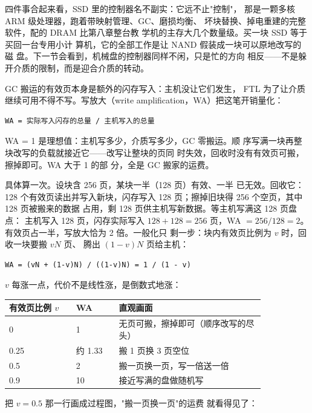 四件事合起来看，SSD 里的控制器名不副实：它远不止"控制"，
那是一颗多核 ARM 级处理器，跑着带映射管理、GC、磨损均衡、
坏块替换、掉电重建的完整软件，配的 DRAM 比第八章整台教
学机的主存大几个数量级。买一块 SSD 等于买回一台专用小计
算机，它的全部工作是让 NAND 假装成一块可以原地改写的磁
盘。下一节会看到，机械盘的控制器同样不闲，只是忙的方向
相反——不是躲开介质的限制，而是迎合介质的转动。

GC 搬运的有效页本身是额外的闪存写入：主机没让它们发生，
FTL 为了让介质继续可用不得不写。写放大（write
amplification，WA）把这笔开销量化：

\begin{lstlisting}
WA = 实际写入闪存的总量 / 主机写入的总量
\end{lstlisting}

WA = 1 是理想值：主机写多少，介质写多少，GC 零搬运。顺
序写满一块再整块改写的负载就接近它——改写让整块的页同
时失效，回收时没有有效页可搬，擦掉即可。WA 大于 1 的部
分，全是 GC 搬家的运费。

具体算一次。设块含 256 页，某块一半（128 页）有效、一半
已无效。回收它：128 个有效页读出并写入新块，闪存写入
128 页；擦掉旧块得 256 个空页，其中 128 页被搬来的数据
占用，剩 128 页供主机写新数据。等主机写满这 128 页盘点：
主机写入 128 页，闪存实际写入 $128+128=256$ 页，WA
$=256/128=2$。有效页占一半，写放大恰为 2 倍。一般化只
剩一步：块内有效页比例为 $v$ 时，回收一块要搬 $vN$ 页、
腾出 $(1-v)N$ 页给主机：

\begin{lstlisting}
WA = (vN + (1-v)N) / ((1-v)N) = 1 / (1 - v)
\end{lstlisting}

$v$ 每涨一点，代价不是线性涨，是倒数式地涨：

\begin{longtable}{L{0.22\linewidth}L{0.14\linewidth}L{0.48\linewidth}}
\toprule
有效页比例 $v$ & WA & 直观画面 \\
 & 1 & 无页可搬，擦掉即可（顺序改写的尽头） \\
0.25 & 约 1.33 & 搬 1 页换 3 页空位 \\
0.5 & 2 & 搬一页换一页，写一倍送一倍 \\
0.9 & 10 & 接近写满的盘做随机写 \\
\bottomrule
\end{longtable}

把 $v=0.5$ 那一行画成过程图，"搬一页换一页"的运费
就看得见了：

